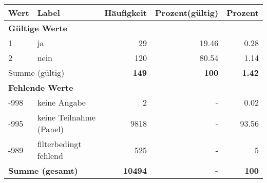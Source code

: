      \begin{longtable}{lXrrr}
     \toprule
     \textbf{Wert} & \textbf{Label} & \textbf{Häufigkeit} & \textbf{Prozent(gültig)} & \textbf{Prozent} \\
     \endhead
     \midrule
     \multicolumn{5}{l}{\textbf{Gültige Werte}}\\

     1 &
     \multicolumn{1}{X}{ ja   } &


       \num{29} &
       \num[round-mode=places,round-precision=2]{19.46} &
         \num[round-mode=places,round-precision=2]{0.28} \\

     2 &
     \multicolumn{1}{X}{ nein   } &


       \num{120} &
       \num[round-mode=places,round-precision=2]{80.54} &
         \num[round-mode=places,round-precision=2]{1.14} \\
     \midrule
     \multicolumn{2}{l}{Summe (gültig)} &
       \textbf{\num{149}} &
     \textbf{\num{100}} &
       \textbf{\num[round-mode=places,round-precision=2]{1.42}} \\
     \multicolumn{5}{l}{\textbf{Fehlende Werte}}\\
       -998 &
       keine Angabe &
         \num{2} &
        - &
         \num[round-mode=places,round-precision=2]{0.02} \\
       -995 &
       keine Teilnahme (Panel) &
         \num{9818} &
        - &
         \num[round-mode=places,round-precision=2]{93.56} \\
       -989 &
       filterbedingt fehlend &
         \num{525} &
        - &
         \num[round-mode=places,round-precision=2]{5} \\
     \midrule
     \multicolumn{2}{l}{\textbf{Summe (gesamt)}} &
          \textbf{\num{10494}} &
        \textbf{-} &
        \textbf{\num{100}} \\
     \bottomrule
     \end{longtable}
     
